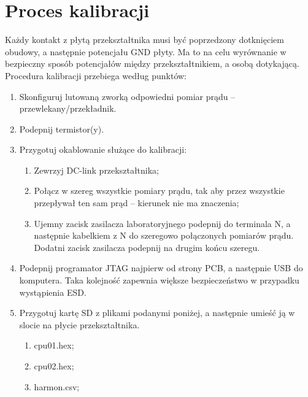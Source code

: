 \documentclass[12pt,a4paper]{article}
\begin{document}
\section{Proces kalibracji}
Każdy kontakt z płytą przekształtnika musi być poprzedzony dotknięciem obudowy, a następnie potencjału GND płyty. Ma to na celu wyrównanie w bezpieczny sposób potencjałów między przekształtnikiem, a osobą dotykającą. Procedura kalibracji przebiega według punktów:
\begin{enumerate}
	\setlength\itemsep{0mm}
	\item Skonfiguruj lutowaną zworką odpowiedni pomiar prądu – przewlekany/przekładnik.

	\item Podepnij termistor(y).

	\item Przygotuj okablowanie służące do kalibracji:
	
	\begin{enumerate}
		\vspace{-2mm}
		\setlength\itemsep{0mm}
		\item Zewrzyj DC-link przekształtnika;

		\item Połącz w szereg wszystkie pomiary prądu, tak aby przez wszystkie przepływał ten sam prąd – kierunek nie ma znaczenia;

		\item Ujemny zacisk zasilacza laboratoryjnego podepnij do terminala N, a następnie kabelkiem z N do szeregowo połączonych pomiarów prądu. Dodatni zacisk zasilacza podepnij na drugim końcu szeregu.
		\vspace{-2mm}
	\end{enumerate}
	\item Podepnij programator JTAG najpierw od strony PCB, a następnie USB do komputera. Taka kolejność zapewnia większe bezpieczeństwo w przypadku wystąpienia ESD.

	\item Przygotuj kartę SD z plikami podanymi poniżej, a następnie umieść ją w slocie na płycie przekształtnika.
	\begin{enumerate}
		\vspace{-2mm}
		\setlength\itemsep{0mm}
		\item cpu01.hex;

		\item cpu02.hex;

		\item harmon.csv;


\end{enumerate}
\end{enumerate}
\end{document}
